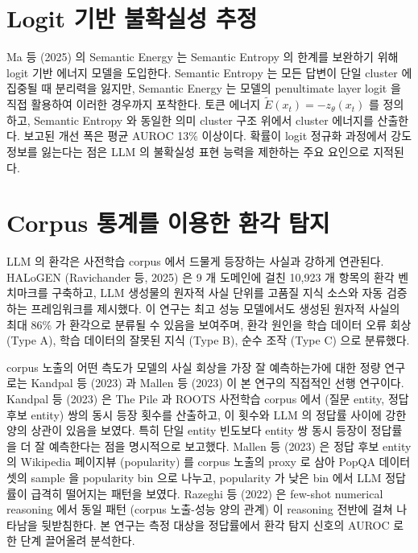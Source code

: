 \documentclass[oneside,ko,under]{snuthesis}
\begin{document}
\section{Logit 기반 불확실성 추정}

Ma 등 (2025)\cite{ma2025} 의 Semantic Energy 는 Semantic Entropy 의 한계를 보완하기 위해 logit 기반 에너지 모델을 도입한다. Semantic Entropy 는 모든 답변이 단일 cluster 에 집중될 때 분리력을 잃지만, Semantic Energy 는 모델의 penultimate layer logit 을 직접 활용하여 이러한 경우까지 포착한다. 토큰 에너지 $\tilde{E}(x_t) = -z_\theta(x_t)$ 를 정의하고, Semantic Entropy 와 동일한 의미 cluster 구조 위에서 cluster 에너지를 산출한다. 보고된 개선 폭은 평균 AUROC 13\% 이상이다. 확률이 logit 정규화 과정에서 강도 정보를 잃는다는 점은 LLM 의 불확실성 표현 능력을 제한하는 주요 요인으로 지적된다.

\section{Corpus 통계를 이용한 환각 탐지}

LLM 의 환각은 사전학습 corpus 에서 드물게 등장하는 사실과 강하게 연관된다. HALoGEN (Ravichander 등, 2025)\cite{ravichander2025halogen} 은 9 개 도메인에 걸친 10{,}923 개 항목의 환각 벤치마크를 구축하고, LLM 생성물의 원자적 사실 단위를 고품질 지식 소스와 자동 검증하는 프레임워크를 제시했다. 이 연구는 최고 성능 모델에서도 생성된 원자적 사실의 최대 86\% 가 환각으로 분류될 수 있음을 보여주며, 환각 원인을 학습 데이터 오류 회상 (Type A), 학습 데이터의 잘못된 지식 (Type B), 순수 조작 (Type C) 으로 분류했다.

corpus 노출의 어떤 측도가 모델의 사실 회상을 가장 잘 예측하는가에 대한 정량 연구로는 Kandpal 등 (2023)\cite{kandpal2023longtail} 과 Mallen 등 (2023)\cite{mallen2023whennot} 이 본 연구의 직접적인 선행 연구이다. Kandpal 등 (2023) 은 The Pile 과 ROOTS 사전학습 corpus 에서 (질문 entity, 정답 후보 entity) 쌍의 동시 등장 횟수를 산출하고, 이 횟수와 LLM 의 정답률 사이에 강한 양의 상관이 있음을 보였다. 특히 단일 entity 빈도보다 entity 쌍 동시 등장이 정답률을 더 잘 예측한다는 점을 명시적으로 보고했다. Mallen 등 (2023) 은 정답 후보 entity 의 Wikipedia 페이지뷰 (popularity) 를 corpus 노출의 proxy 로 삼아 PopQA 데이터셋의 sample 을 popularity bin 으로 나누고, popularity 가 낮은 bin 에서 LLM 정답률이 급격히 떨어지는 패턴을 보였다. Razeghi 등 (2022)\cite{razeghi2022termfreq} 은 few-shot numerical reasoning 에서 동일 패턴 (corpus 노출-성능 양의 관계) 이 reasoning 전반에 걸쳐 나타남을 뒷받침한다. 본 연구는 측정 대상을 정답률에서 환각 탐지 신호의 AUROC 로 한 단계 끌어올려 분석한다.
\end{document}

